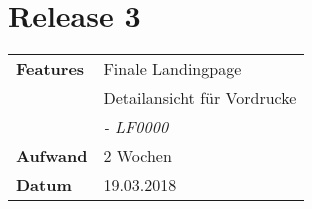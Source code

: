 
\section*{Release 3}
\label{sec:release_3}

\begin{tabular}{p{5cm} p{9cm}}
    \textbf{Features} & Finale Landingpage \\
    & Detailansicht für Vordrucke \\
    & \hspace{8pt} \textit{\footnotesize - LF0000} \\
    \hline
    \textbf{Aufwand} & 2 Wochen \\
    \hline
    \textbf{Datum} & 19.03.2018 \\
\end{tabular}
